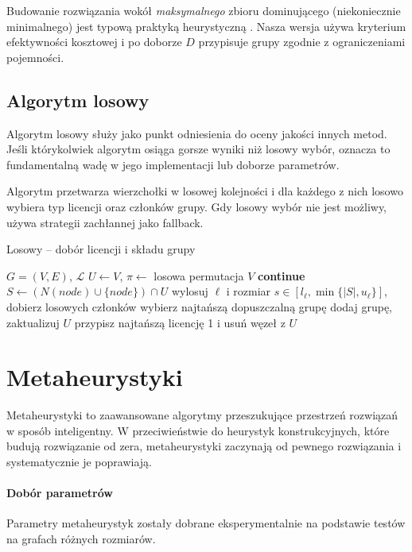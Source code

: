 Budowanie rozwiązania wokół \emph{maksymalnego} zbioru dominującego (niekoniecznie minimalnego) jest typową praktyką heurystyczną \cite{haynes1998domination}. Nasza wersja używa kryterium efektywności kosztowej i po doborze $D$ przypisuje grupy zgodnie z ograniczeniami pojemności.

\subsection{Algorytm losowy}\label{subsec:random}

Algorytm losowy służy jako punkt odniesienia do oceny jakości innych metod. Jeśli którykolwiek algorytm osiąga gorsze wyniki niż losowy wybór, oznacza to fundamentalną wadę w jego implementacji lub doborze parametrów.

Algorytm przetwarza wierzchołki w losowej kolejności i dla każdego z nich losowo wybiera typ licencji oraz członków grupy. Gdy losowy wybór nie jest możliwy, używa strategii zachłannej jako fallback.

\begin{algorithm}[H]
\caption{Losowy -- dobór licencji i składu grupy}
\label{alg:randomized}
\begin{algorithmic}[1]
\Require $G=(V,E)$, $\mathcal{L}$
\State $U\gets V$, $\pi\gets$ losowa permutacja $V$
   \textbf{continue}\EndIf
  \State $S\gets(N(node)\cup\{node\})\cap U$
    \State wylosuj $\ell$ i rozmiar $s\in[l_\ell,\min\{|S|,u_\ell\}]$, dobierz losowych członków
  \Else
    \State wybierz najtańszą dopuszczalną grupę
  \EndIf
  \State dodaj grupę, zaktualizuj $U$
\EndFor
{} przypisz najtańszą licencję 1 i usuń węzeł z $U$ \EndWhile
\end{algorithmic}
\end{algorithm}


\section{Metaheurystyki}

Metaheurystyki to zaawansowane algorytmy przeszukujące przestrzeń rozwiązań w sposób inteligentny. W przeciwieństwie do heurystyk konstrukcyjnych, które budują rozwiązanie od zera, metaheurystyki zaczynają od pewnego rozwiązania i systematycznie je poprawiają.

\paragraph{Dobór parametrów}
Parametry metaheurystyk zostały dobrane eksperymentalnie na podstawie testów na grafach różnych rozmiarów.

